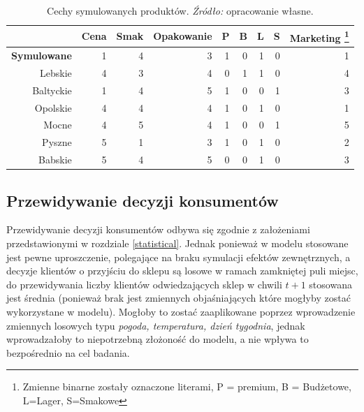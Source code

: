 \documentclass[polish, twoside, 12pt, a4paper]{article}
\theoremstyle{definition}
\theoremstyle{plain}
\theoremstyle{remark}
\begin{document}
\begin{table}[hbt] 
  \centering

  \captionsetup{margin=10pt,font=small,labelfont=bf,width=.8\textwidth}

  \caption[Przykład prostej tablicy]{Cechy symulowanych produktów. \textit{Źródło:} opracowanie własne.}
  \label{tab:produkty}

\vspace*{2ex}
  \begin{tabular}{rrrrrrrrr}
  \hline
 & Cena & Smak & Opakowanie & P & B & L & S & Marketing \footnote{Zmienne binarne zostały oznaczone literami, P = premium, B = Budżetowe, L=Lager, S=Smakowe}\\ 
  \hline
\textbf{Symulowane} &   1 &   4 &   3 &   1 &   0 &   1 &   0 &   1 \\ 
  Lebskie &   4 &   3 &   4 &   0 &   1 &   1 &   0 &   4 \\ 
  Baltyckie &   1 &   4 &   5 &   1 &   0 &   0 &   1 &   3 \\ 
  Opolskie &   4 &   4 &   4 &   1 &   0 &   1 &   0 &   1 \\ 
  Mocne &   4 &   5 &   4 &   1 &   0 &   0 &   1 &   5 \\ 
  Pyszne &   5 &   1 &   3 &   1 &   0 &   1 &   0 &   2 \\ 
  Babskie &   5 &   4 &   5 &   0 &   0 &   1 &   0 &   3 \\ 
   \hline
\end{tabular}
\end{table} 

\subsection{Przewidywanie decyzji konsumentów}

Przewidywanie decyzji konsumentów odbywa się zgodnie z założeniami przedstawionymi w rozdziale \ref{statistical}. Jednak ponieważ w modelu stosowane jest pewne uproszczenie, polegające na braku symulacji efektów zewnętrznych, a decyzje klientów o przyjściu do sklepu są losowe w ramach zamkniętej puli miejsc, do przewidywania liczby klientów odwiedzających sklep w chwili $t+1$ stosowana jest średnia (ponieważ brak jest zmiennych objaśniających które mogłyby zostać wykorzystane w modelu). Mogłoby to zostać zaaplikowane poprzez wprowadzenie zmiennych losowych typu \textit{pogoda, temperatura, dzień tygodnia}, jednak wprowadzałoby to niepotrzebną złożoność do modelu, a nie wpływa to bezpośrednio na cel badania. 
\end{document}
